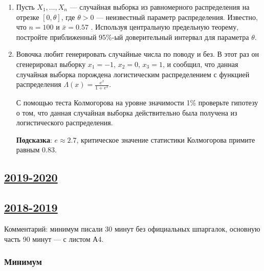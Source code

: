 \begin{enumerate}
\item Пусть $X_{1}, \ldots, X_{n}$  — случайная выборка из равномерного распределения на отрезке $[0,\theta]$, где $\theta>0$ — неизвестный параметр распределения. Известно, что $n=100$  и $\bar x=0.57$ . Используя центральную предельную теорему, постройте приближенный 95\%-ый доверительный интервал для параметра $\theta$.

\item Вовочка любит генерировать случайные числа по поводу и без. 
В этот раз он сгенерировал выборку $x_{1}=-1$, $x_{2}=0$, $x_{3}=1$, и сообщил, 
что данная случайная выборка порождена логистическим распределением с функцией распределения $\Lambda(x)=\frac{e^{x}}{1+e^{x}}$. 

С помощью теста Колмогорова на уровне значимости 1\% проверьте гипотезу о том, 
что данная случайная выборка действительно была получена из логистического распределения. 

\textbf{Подсказка}: $e \approx 2.7$, критическое значение статистики Колмогорова примите равным $0.83$.

\end{enumerate}
	


\subsection[2019-2020]{\hyperref[sec:sol_kr_04_2019_2020]{2019-2020}}
\label{sec:kr_04_2019_2020}



\subsection[2018-2019]{\hyperref[sec:sol_kr_04_2018_2019]{2018-2019}}
\label{sec:kr_04_2018_2019}

Комментарий: минимум писали 30 минут без официальных шпаргалок, основную часть 90 минут — с листом А4. 

\subsubsection*{Минимум}


